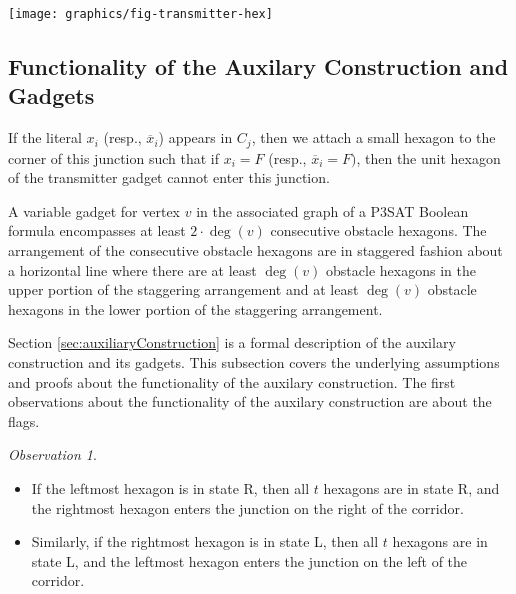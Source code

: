 \documentclass[10pt]{CSUNthesis}
\theoremstyle{plain}%
\theoremstyle{definition}
\theoremstyle{remark}
\newtheorem{observation}{Observation}
\begin{document}
\begin{minipage}{\linewidth}
\begin{center}
	\texttt{[image: graphics/fig-transmitter-hex]}
	\label{fig:transmitter}
\end{center}
\end{minipage} 

\subsection{Functionality of the Auxilary Construction and Gadgets}

If the literal $x_i$ (resp., $\overline{x}_i$) appears in $C_j$, then we attach a small hexagon to the corner of this junction such that if $x_i=F$ (resp., $\overline{x}_i=F)$, then the unit hexagon of the transmitter gadget cannot enter this junction. 

A variable gadget for vertex $v$ in the associated graph of a P3SAT Boolean formula encompasses at least $2 \cdot \deg (v)$ consecutive obstacle hexagons. 
The arrangement of the consecutive obstacle hexagons are in staggered fashion about a horizontal line where there are at least $\deg (v)$ obstacle hexagons in the upper portion of the staggering arrangement and at least $\deg (v)$ obstacle hexagons in the lower portion of the staggering arrangement.

Section \ref{sec:auxiliaryConstruction} is a formal description of the auxilary construction and its gadgets.
This subsection covers the underlying assumptions and proofs about the functionality of the auxilary construction.
The first observations about the functionality of the auxilary construction are about the flags.
\begin{observation}\label{obs:corridor}

\begin{itemize}

\item[(1)] If the leftmost hexagon is in state R, then all $t$ hexagons are in state R, and the rightmost hexagon enters the junction on the right of the corridor.
\item[(2)] Similarly, if the rightmost hexagon is in state L, then all $t$ hexagons are in state L, and the leftmost hexagon enters the junction on the left of the corridor.
\end{itemize}
\end{observation}
\end{document}
